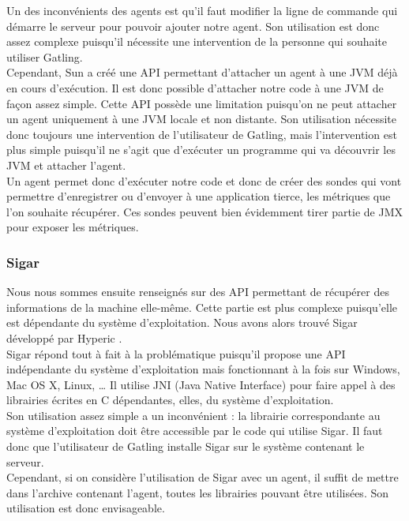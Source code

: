 Un des inconvénients des agents est qu'il faut modifier la ligne de commande qui démarre le serveur pour pouvoir ajouter notre agent. Son utilisation est donc assez complexe puisqu'il nécessite une intervention de la personne qui souhaite utiliser Gatling.\\

Cependant, Sun a créé une API permettant d'attacher un agent à une JVM déjà en cours d'exécution. Il est donc possible d'attacher notre code à une JVM de façon assez simple. Cette API possède une limitation puisqu'on ne peut attacher un agent uniquement à une JVM locale et non distante. Son utilisation nécessite donc toujours une intervention de l'utilisateur de Gatling, mais l'intervention est plus simple puisqu'il ne s'agit que d'exécuter un programme qui va découvrir les JVM et attacher l'agent.\\

Un agent permet donc d'exécuter notre code et donc de créer des sondes qui vont permettre d'enregistrer ou d'envoyer à une application tierce, les métriques que l'on souhaite récupérer. Ces sondes peuvent bien évidemment tirer partie de JMX pour exposer les métriques.

\subsubsection{Sigar}

Nous nous sommes ensuite renseignés sur des API permettant de récupérer des informations de la machine elle-même. Cette partie est plus complexe puisqu'elle est dépendante du système d'exploitation. Nous avons alors trouvé Sigar développé par Hyperic \cite{sigar}.\\

Sigar répond tout à fait à la problématique puisqu'il propose une API indépendante du système d'exploitation mais fonctionnant à la fois sur Windows, Mac OS X, Linux, \dots{} Il utilise JNI (Java Native Interface) pour faire appel à des librairies écrites en C dépendantes, elles, du système d'exploitation.\\

Son utilisation assez simple a un inconvénient : la librairie correspondante au système d'exploitation doit être accessible par le code qui utilise Sigar. Il faut donc que l'utilisateur de Gatling installe Sigar sur le système contenant le serveur.\\

Cependant, si on considère l'utilisation de Sigar avec un agent, il suffit de mettre dans l'archive contenant l'agent, toutes les librairies pouvant être utilisées. Son utilisation est donc envisageable.

